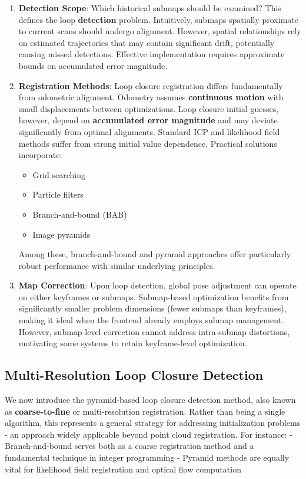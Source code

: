 \begin{enumerate}
	\item \textbf{Detection Scope}: Which historical submaps should be examined? This defines the loop \textbf{detection} problem. Intuitively, submaps spatially proximate to current scans should undergo alignment. However, spatial relationships rely on estimated trajectories that may contain significant drift, potentially causing missed detections. Effective implementation requires approximate bounds on accumulated error magnitude.
	
	\item \textbf{Registration Methods}: Loop closure registration differs fundamentally from odometric alignment. Odometry assumes \textbf{continuous motion} with small displacements between optimizations. Loop closure initial guesses, however, depend on \textbf{accumulated error magnitude} and may deviate significantly from optimal alignments. Standard ICP and likelihood field methods suffer from strong initial value dependence. Practical solutions incorporate:
	\begin{itemize}
		\item Grid searching \cite{Scherer2013}
		\item Particle filters \cite{Stachniss2005} 
		\item Branch-and-bound (BAB) \cite{Hess2016}
		\item Image pyramids \cite{Qianhao2018}
	\end{itemize}
	Among these, branch-and-bound and pyramid approaches offer particularly robust performance with similar underlying principles.
	
	\item \textbf{Map Correction}: Upon loop detection, global pose adjustment can operate on either keyframes or submaps. Submap-based optimization benefits from significantly smaller problem dimensions (fewer submaps than keyframes), making it ideal when the frontend already employs submap management. However, submap-level correction cannot address intra-submap distortions, motivating some systems to retain keyframe-level optimization.
\end{enumerate}

\subsection{Multi-Resolution Loop Closure Detection}  
We now introduce the pyramid-based loop closure detection method, also known as \textbf{coarse-to-fine} or multi-resolution registration. Rather than being a single algorithm, this represents a general strategy for addressing initialization problems - an approach widely applicable beyond point cloud registration. For instance:  
- Branch-and-bound serves both as a coarse registration method and a fundamental technique in integer programming  
- Pyramid methods are equally vital for likelihood field registration and optical flow computation \cite{Fortun2015}  

